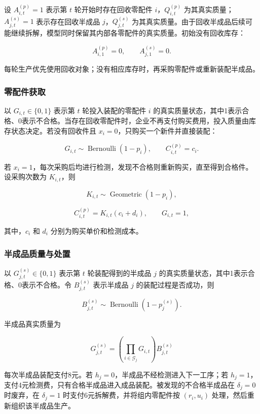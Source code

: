 \documentclass{cumcm}
\numberwithin{figure}{section}
\numberwithin{table}{section}
\begin{document}
设 \(A_{i,t}^{(p)}=1\) 表示第 \(t\) 轮开始时存在回收零配件 \(i\)，\(Q_{i,t}^{(p)}\) 为其真实质量；\(A_{j,t}^{(s)}=1\) 表示存在回收半成品 \(j\)，\(Q_{j,t}^{(s)}\) 为其真实质量。由于回收半成品后续可能继续拆解，模型同时保留其内部各零配件的真实质量。初始没有回收库存：

\[
A_{i,1}^{(p)}=0,\qquad A_{j,1}^{(s)}=0.
\]

每轮生产优先使用回收对象；没有相应库存时，再采购零配件或重新装配半成品。

\subsubsection{零配件获取}\label{ux96f6ux914dux4ef6ux83b7ux53d6}

以 \(G_{i,t}\in\{0,1\}\) 表示第 \(t\) 轮投入装配的零配件 \(i\) 的真实质量状态，其中1表示合格、0表示不合格。当存在回收零配件时，企业不再支付购买费用，投入质量由库存状态决定。若没有回收件且 \(x_i=0\)，只购买一个新件并直接装配：

\[
G_{i,t}\sim\operatorname{Bernoulli}(1-p_i),
\qquad C_{i,t}^{(p)}=c_i.
\]

若 \(x_i=1\)，每次采购后均进行检测，发现不合格则重新购买，直至得到合格件。设采购次数为 \(K_{i,t}\)，则

\[
K_{i,t}\sim\operatorname{Geometric}(1-p_i),
\]

\[
C_{i,t}^{(p)}=K_{i,t}(c_i+d_i),
\qquad G_{i,t}=1,
\]

其中，\(c_i\) 和 \(d_i\) 分别为购买单价和检测成本。

\subsubsection{半成品质量与处置}\label{ux534aux6210ux54c1ux8d28ux91cfux4e0eux5904ux7f6e}

以 \(G_{j,t}^{(s)}\in\{0,1\}\) 表示第 \(t\) 轮装配得到的半成品 \(j\) 的真实质量状态，其中1表示合格、0表示不合格。令 \(B_{j,t}^{(s)}\) 表示半成品 \(j\) 的装配过程是否成功，则

\[
B_{j,t}^{(s)}\sim\operatorname{Bernoulli}(1-p_j^{(s)}).
\]

半成品真实质量为

\[
G_{j,t}^{(s)}=
\left(\prod_{i\in\mathcal G_j}G_{i,t}\right)B_{j,t}^{(s)}
\]

每次半成品装配支付8元。若 \(h_j=0\)，半成品不经检测进入下一工序；若 \(h_j=1\)，支付4元检测费，只有合格半成品进入成品装配。被发现的不合格半成品在 \(\delta_j=0\) 时废弃，在 \(\delta_j=1\) 时支付6元拆解费，并将组内零配件按 \((r_i,u_i)\) 处理，然后重新组织该半成品生产。
\end{document}
